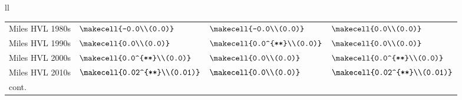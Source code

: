 \begin{tabular}{ll}
\begin{tabular}{llll}
Miles HVL 1980s     &          $\makecell{-0.0\\(0.0)}$ &         $\makecell{-0.0\\(0.0)}$ &           $\makecell{0.0\\(0.0)}$ \\
Miles HVL 1990s     &           $\makecell{0.0\\(0.0)}$ &     $\makecell{0.0^{**}\\(0.0)}$ &           $\makecell{0.0\\(0.0)}$ \\
Miles HVL 2000s     &      $\makecell{0.0^{**}\\(0.0)}$ &          $\makecell{0.0\\(0.0)}$ &      $\makecell{0.0^{**}\\(0.0)}$ \\
Miles HVL 2010s     &    $\makecell{0.02^{**}\\(0.01)}$ &          $\makecell{0.0\\(0.0)}$ &    $\makecell{0.02^{**}\\(0.01)}$ \\
\bottomrule
cont.
\end{tabular}


\end{tabular}
